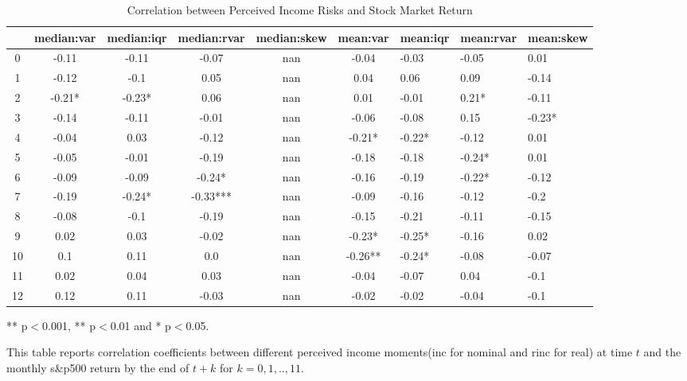 \documentclass[12pt,notitlepage,onecolumn,aps,pra]{article}
\begin{document}
\begin{table}[ht]
\centering
\begin{adjustbox}{width={\textwidth}}
\begin{threeparttable}
\caption{Correlation between Perceived Income Risks and Stock Market Return}
\label{macro_corr}
\begin{tabular}{cccccclll}
\toprule
{} & median:var & median:iqr & median:rvar & median:skew & mean:var & mean:iqr & mean:rvar & mean:skew \\
\midrule
0  &      -0.11 &      -0.11 &       -0.07 &         nan &    -0.04 &    -0.03 &     -0.05 &      0.01 \\
1  &      -0.12 &       -0.1 &        0.05 &         nan &     0.04 &     0.06 &      0.09 &     -0.14 \\
2  &     -0.21* &     -0.23* &        0.06 &         nan &     0.01 &    -0.01 &     0.21* &     -0.11 \\
3  &      -0.14 &      -0.11 &       -0.01 &         nan &    -0.06 &    -0.08 &      0.15 &    -0.23* \\
4  &      -0.04 &       0.03 &       -0.12 &         nan &   -0.21* &   -0.22* &     -0.12 &      0.01 \\
5  &      -0.05 &      -0.01 &       -0.19 &         nan &    -0.18 &    -0.18 &    -0.24* &      0.01 \\
6  &      -0.09 &      -0.09 &      -0.24* &         nan &    -0.16 &    -0.19 &    -0.22* &     -0.12 \\
7  &      -0.19 &     -0.24* &    -0.33*** &         nan &    -0.09 &    -0.16 &     -0.12 &      -0.2 \\
8  &      -0.08 &       -0.1 &       -0.19 &         nan &    -0.15 &    -0.21 &     -0.11 &     -0.15 \\
9  &       0.02 &       0.03 &       -0.02 &         nan &   -0.23* &   -0.25* &     -0.16 &      0.02 \\
10 &        0.1 &       0.11 &         0.0 &         nan &  -0.26** &   -0.24* &     -0.08 &     -0.07 \\
11 &       0.02 &       0.04 &        0.03 &         nan &    -0.04 &    -0.07 &      0.04 &      -0.1 \\
12 &       0.12 &       0.11 &       -0.03 &         nan &    -0.02 &    -0.02 &     -0.04 &      -0.1 \\
\bottomrule
\end{tabular}
\begin{tablenotes}
\item *** p$<$0.001, ** p$<$0.01 and * p$<$0.05.
\item This table reports correlation coefficients between different perceived income moments(inc for nominal
and rinc for real) at time
$t$ and the monthly s\&p500 return by the end of $t+k$ for $k=0,1,..,11$.
\end{tablenotes}
\end{threeparttable}
\end{adjustbox}
\end{table}
\end{document}
